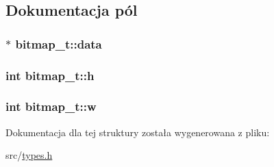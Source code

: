 \subsection{Dokumentacja pól}
\hypertarget{structbitmap__t_a8a7a3c349b7e6989a76783e6abd1b877}{
\subsubsection[{data}]{$\ast$ bitmap\-\_\-t\-::data}}\label{structbitmap__t_a8a7a3c349b7e6989a76783e6abd1b877}
\hypertarget{structbitmap__t_ae7a00c3d9c5e30f6bdd7d3ebf45177bc}{
\subsubsection[{h}]{\setlength{\rightskip}{0pt plus 5cm}int bitmap\-\_\-t\-::h}}\label{structbitmap__t_ae7a00c3d9c5e30f6bdd7d3ebf45177bc}
\hypertarget{structbitmap__t_a58e10d5da708485f6522b90cf39f3925}{
\subsubsection[{w}]{\setlength{\rightskip}{0pt plus 5cm}int bitmap\-\_\-t\-::w}}\label{structbitmap__t_a58e10d5da708485f6522b90cf39f3925}


Dokumentacja dla tej struktury została wygenerowana z pliku\-:\begin{DoxyCompactItemize}
\item 
src/\hyperlink{types_8h}{types.\-h}\end{DoxyCompactItemize}
